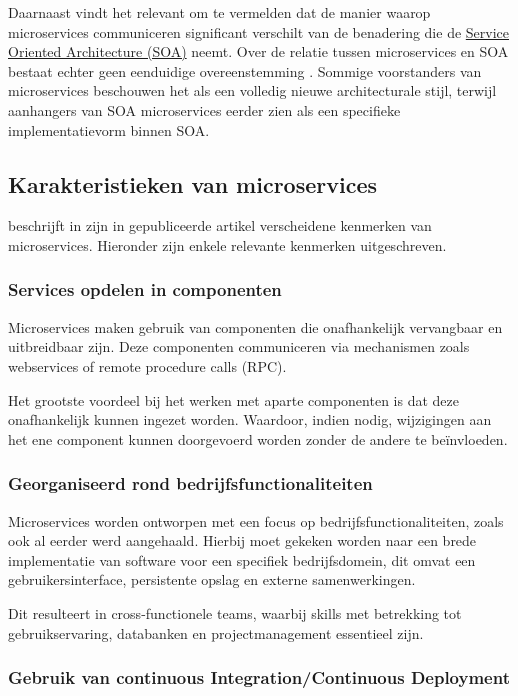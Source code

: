 Daarnaast vindt \textcite{Blinowski2022} het relevant om te vermelden dat de manier waarop microservices communiceren significant verschilt van de benadering die de \hyperref[sec:SOA_architectuur]{Service Oriented Architecture (SOA)} neemt. Over de relatie tussen microservices en SOA bestaat echter geen eenduidige overeenstemming \autocite{Li2021}. Sommige voorstanders van microservices beschouwen het als een volledig nieuwe architecturale stijl, terwijl aanhangers van SOA microservices eerder zien als een specifieke implementatievorm binnen SOA.

\subsection{Karakteristieken van microservices}

\textcite{Bakshi2017} beschrijft in zijn in gepubliceerde artikel verscheidene kenmerken van microservices. Hieronder zijn enkele relevante kenmerken uitgeschreven.

\subsubsection{Services opdelen in componenten}

Microservices maken gebruik van componenten die onafhankelijk vervangbaar en uitbreidbaar zijn. Deze componenten communiceren via mechanismen zoals webservices of remote procedure calls (RPC).

Het grootste voordeel bij het werken met aparte componenten is dat deze onafhankelijk kunnen ingezet worden. Waardoor, indien nodig, wijzigingen aan het ene component kunnen doorgevoerd worden zonder de andere te beïnvloeden.

\subsubsection{Georganiseerd rond bedrijfsfunctionaliteiten}

Microservices worden ontworpen met een focus op bedrijfsfunctionaliteiten, zoals ook al eerder werd aangehaald. Hierbij moet gekeken worden naar een brede implementatie van software voor een specifiek bedrijfsdomein, dit omvat een gebruikersinterface, persistente opslag en externe samenwerkingen.

Dit resulteert in cross-functionele teams, waarbij skills met betrekking tot gebruikservaring, databanken en projectmanagement essentieel zijn.

\subsubsection{Gebruik van continuous Integration/Continuous Deployment}


